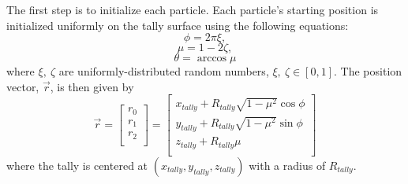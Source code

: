 The first step is to initialize each particle. Each particle's starting position is initialized uniformly on the tally surface using the following equations:
\begin{equation} \label{Eq:pos_phi}
\phi = 2 \pi \xi ,
\end{equation}
\begin{equation}
\mu = 1 - 2 \zeta,
\end{equation}
\begin{equation} \label{Eq:pos_cost}
\theta = \arccos{\mu}
\end{equation}
where $\xi,~\zeta$ are uniformly-distributed random numbers, $\xi,~\zeta \in [0,1]$. The position vector, $\vec{r}$, is then given by
\begin{equation}
\vec{r} =
\begin{bmatrix}  
r_{0} \\
r_{1} \\
r_{2} \\
\end{bmatrix}
=
\begin{bmatrix}  
x_{tally} + R_{tally} \sqrt{1-\mu^{2}}  \cos{\phi}    \\
y_{tally} + R_{tally} \sqrt{1 - \mu^{2}} \sin{\phi}    \\
z_{tally} + R_{tally} \mu 										 \\
\end{bmatrix}
\end{equation}
where the tally is centered at $(x_{tally}, y_{tally}, z_{tally})$ with a radius of $R_{tally}$. 


